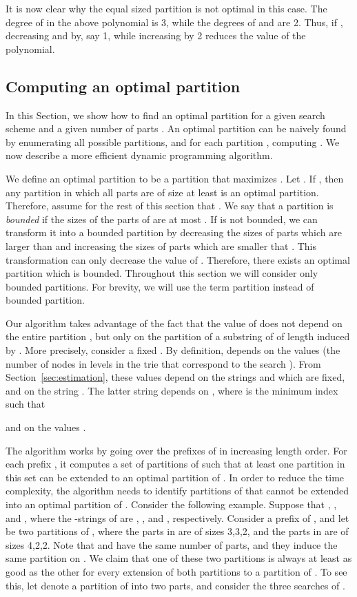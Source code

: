 \documentclass[12pt]{article}
\begin{document}
It is now clear why the equal sized partition is not optimal in this case.
The degree of  in the above polynomial is 3, while
the degrees of  and  are 2.
Thus, if , decreasing  and  by, say 1,
while increasing  by 2 reduces the value of the polynomial.
\fi

\subsection{Computing an optimal partition}
In this Section, we show how to find an optimal partition for a given
search scheme  and a given number of parts .
An optimal partition can be naively found by enumerating
all  possible partitions, and for each partition , computing
.
We now describe a more efficient dynamic programming algorithm.

We define an optimal partition to be a partition that maximizes
.
Let .
If , then any partition in which all parts are of size at least
 is an optimal partition.
Therefore, assume for the rest of this section that .
We say that a partition  is \emph{bounded} if the sizes of the parts
of  are at most .
If  is not bounded, we can transform it into a bounded
partition by decreasing the sizes of parts which are larger than 
and increasing the sizes of parts which are smaller that .
This transformation 
can only decrease the value of
.
Therefore, there exists an optimal partition which is bounded.
Throughout this section we will consider only bounded partitions.
For brevity, we will use the term partition instead of bounded partition.

Our algorithm takes advantage of the fact that the value of
 does not depend on the entire
partition , but only on the partition of a substring of 
of length  induced by .
More precisely, consider a fixed .
By definition,
 depends on
the values  (the number of nodes in
levels  in the trie that correspond to the search ).
From Section~\ref{sec:estimation}, these values depend on
the strings  and  which are fixed, and on the string
.
The latter string depends on ,
where  is the minimum index such that

and on the values 
.

The algorithm works by going over the prefixes of  in increasing length
order. For each prefix , it computes a set of partitions of 
such that at least one partition in this set can be extended to an optimal
partition of .
In order to reduce the time complexity, the algorithm needs to identify
partitions of  that cannot be extended into an optimal partition of .
Consider the following example.
Suppose that , ,  and ,
where the -strings of  are , ,
and , respectively.
Consider a prefix  of , and let
 be two partitions of ,
where the parts in  are of sizes 3,3,2,
and the parts in  are of sizes 4,2,2.
Note that  and  have the same number of parts,
and they induce the same partition on .
We claim that one of these two partitions is always at least as good
as the other for every extension of both partitions to a partition of .
To see this, let  denote a partition of  into
two parts, and consider the three searches of .
\end{document}
